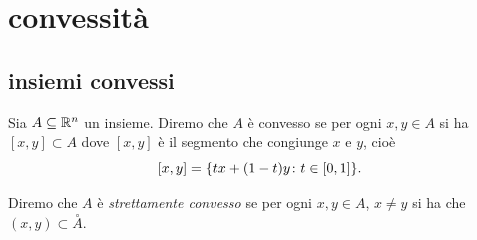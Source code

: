 \section{convessità}

\subsection{insiemi convessi}

\begin{definition}
Sia $A \subseteq {\mathbb R}^n$ un insieme. 
Diremo che $A$ è convesso se per ogni $x,y \in A$ 
si ha $[x,y]\subset A$ dove $[x,y]$ è il segmento che congiunge $x$ e $y$, cioè
\[
    [x,y] = {\left\{ t x + (1-t) y \colon t \in [0,1] \right\}}.
\]

Diremo che $A$ è \emph{strettamente convesso} se per ogni $x,y \in A$, $x\neq y$ si ha
che $(x,y) \subset \stackrel\circ A$.
\end{definition}

